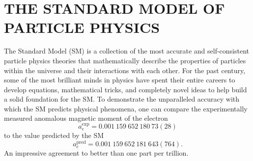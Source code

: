 \chapter{THE STANDARD MODEL OF PARTICLE PHYSICS}
\label{ch:theory}

The Standard Model (SM) is a collection of the most accurate and self-consistent particle physics theories that mathematically describe the properties of particles within the universe and their interactions with each other.
For the past century, some of the most brilliant minds in physics have spent their entire careers to develop equations, mathematical tricks, and completely novel ideas to help build a solid foundation for the SM.
To demonstrate the unparalleled accuracy with which the SM predicts physical phenomena, one can compare the experimentally measured anomalous magnetic moment of the electron
\begin{equation*}
    a_e^{\mathrm{exp}} = 0.001\ 159\ 652\ 180\ 73(28)
\end{equation*}
to the value predicted by the SM
\begin{equation*}
    a_e^{\mathrm{pred}} = 0.001\ 159\ 652\ 181\ 643(764).
\end{equation*}
An impressive agreement to better than one part per trillion.

